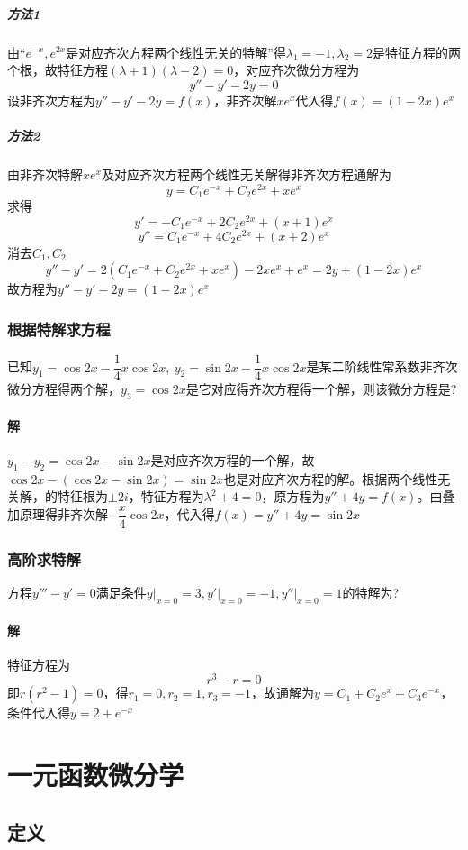 \subparagraph{方法1}
由“\(e^{-x}, e^{2x}\)是对应齐次方程两个线性无关的特解”得\(\lambda_1 = -1, \lambda_2 = 2\)是特征方程的两个根，故特征方程\((\lambda + 1)(\lambda - 2) = 0\)，对应齐次微分方程为\[y'' - y' - 2y = 0\]
设非齐次方程为\(y'' - y' - 2y = f(x)\)，非齐次解\(xe^x\)代入得\(f(x) = (1 - 2x)e^x\)

\subparagraph{方法2}
由非齐次特解\(xe^x\)及对应齐次方程两个线性无关解得非齐次方程通解为\[y = C_1e^{-x} + C_2e^{2x} + xe^x\]
求得\[y' = -C_1e^{-x} + 2C_2e^{2x} + (x + 1)e^x\]
\[y'' = C_1e^{-x} + 4C_2e^{2x} + (x + 2)e^x\]
消去\(C_1, C_2\)\[y'' - y' = 2(C_1e^{-x} + C_2e^{2x} + xe^x) - 2xe^x + e^x = 2y + (1 - 2x)e^x\]
故方程为\(y'' - y' - 2y = (1 - 2x)e^x\)


\subsubsection{根据特解求方程}
已知\(y_1 = \cos2x - \dfrac{1}{4}x\cos2x,\ y_2 = \sin2x - \dfrac{1}{4}x\cos2x\)是某二阶线性常系数非齐次微分方程得两个解，\(y_3 = \cos2x\)是它对应得齐次方程得一个解，则该微分方程是?

\paragraph{解}
\(y_1 - y_2 = \cos2x - \sin2x\)是对应齐次方程的一个解，故\(\cos2x - (\cos2x - \sin2x) = \sin2x\)也是对应齐次方程的解。根据两个线性无关解，的特征根为\(\pm2i\)，特征方程为\(\lambda^2 + 4 = 0\)，原方程为\(y'' + 4y = f(x)\)。由叠加原理得非齐次解\(-\dfrac{x}{4}\cos2x\)，代入得\(f(x) = y'' + 4y = \sin2x\)


\subsubsection{高阶求特解}
方程\(y''' - y' = 0\)满足条件\(y\bigg|_{x = 0} = 3, y'\bigg|_{x = 0} = -1, y''\bigg|_{x = 0} = 1\)的特解为?
\paragraph{解}
特征方程为\[r^3 - r = 0\]即\(r(r^2 - 1) = 0\)，得\(r_1 = 0, r_2 = 1, r_3 = -1\)，故通解为\(y = C_1 + C_2e^x + C_3e^{-x}\)，条件代入得\(y = 2 + e^{-x}\)


\section{一元函数微分学}

\subsection{定义}

